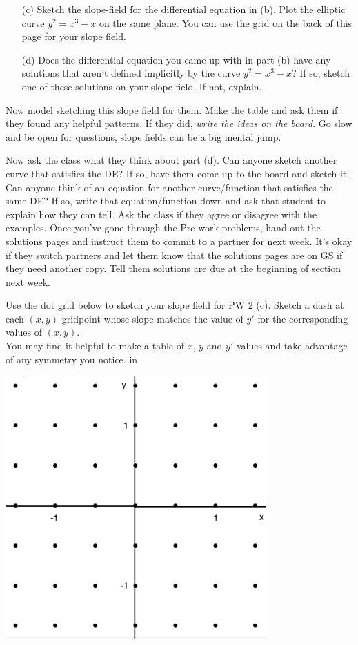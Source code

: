 \documentclass[epsf]{article}
\begin{document}
\begin{itemize}
\item[(c)] Sketch the slope-field for the differential equation in (b). Plot the elliptic curve
$y^2=x^3-x$ on the same plane.  You can use the grid on the back of this page for your slope field.

\item[(d)] Does the differential equation you came up with in part (b) have any solutions that aren't defined implicitly by the curve $y^2=x^3-x$?  If so, sketch one of these solutions on your slope-field.  If not, explain.
\end{itemize}

 Now model sketching this slope field for them.  Make the table and ask them if they found any helpful patterns.  If they did, \textit{write the ideas on the board}.  Go slow and be open for questions, slope fields can be a big mental jump.

\vskip 2mm

 Now ask the class what they think about part (d).  Can anyone sketch another curve that satisfies the DE?  If so, have them come up to the board and sketch it.  Can anyone think of an equation for another curve/function that satisfies the same DE?  If so, write that equation/function down and ask that student to explain how they can tell.  Ask the class if they agree or disagree with the examples.  
\vskip 2mm
 Once you've gone through the Pre-work problems, hand out the solutions pages and instruct them to commit to a partner for next week.  It's okay if they switch partners and let them know that the solutions pages are on GS if they need another copy.  Tell them solutions are due at the beginning of section next week.


\newpage


Use the dot grid below to sketch your slope field for PW 2 (c).  Sketch a dash at each $(x,y)$ gridpoint whose slope matches the value of $y'$ for the corresponding values of $(x,y)$. \\

You may find it helpful to make a table of $x$, $y$ and $y'$ values and take advantage of any symmetry you notice.
 in
\begin{center}
\includegraphics[width=100mm]{dotgrid.png}
\end{center}
\end{document}

